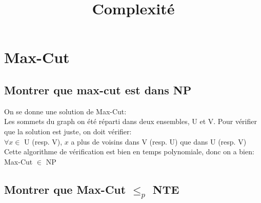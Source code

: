 \documentclass[a4paper]{report}
\title{Complexité}
\begin{document}
\chapter*{Max-Cut}


\section{ Montrer que max-cut est dans NP }
On se donne une solution de Max-Cut:\\
Les sommets du graph on été réparti dans deux ensembles, U et V. 
Pour vérifier que la solution est juste, on doit vérifier:\\
$ \forall x \in $ U (resp. V), $ x $ a plus de voisins dans V (resp. U) que dans U (resp. V)\\
Cette algorithme de vérification est bien en temps polynomiale, donc on a bien:\\
Max-Cut $ \in $ NP\\

\section{ Montrer que Max-Cut $ \leq_p $ NTE }
\end{document}
